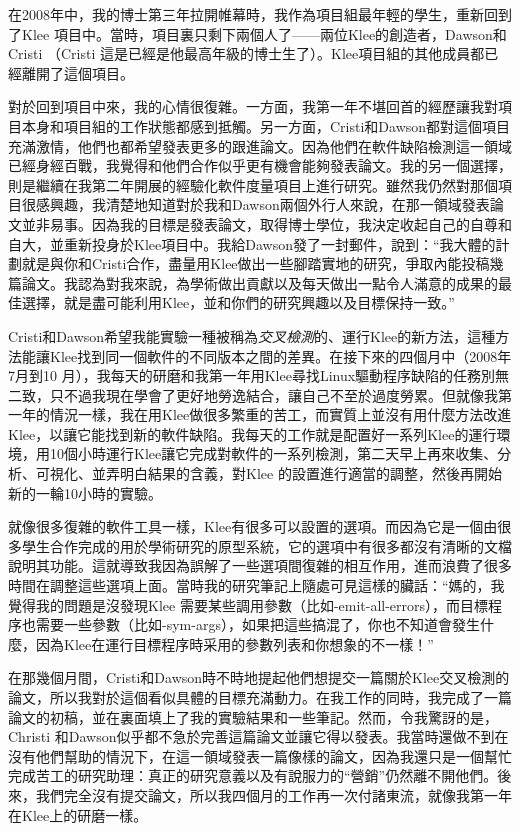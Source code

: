 \documentclass[12pt,UTF8,nofonts]{book}
\begin{document}

在2008年中，我的博士第三年拉開帷幕時，我作為項目組最年輕的學生，重新回到了Klee 項目中。當時，項目裏只剩下兩個人了——兩位Klee的創造者，Dawson和Cristi （Cristi 這是已經是他最高年級的博士生了）。Klee項目組的其他成員都已經離開了這個項目。

對於回到項目中來，我的心情很復雜。一方面，我第一年不堪回首的經歷讓我對項目本身和項目組的工作狀態都感到抵觸。另一方面，Cristi和Dawson都對這個項目充滿激情，他們也都希望發表更多的跟進論文。因為他們在軟件缺陷檢測這一領域已經身經百戰，我覺得和他們合作似乎更有機會能夠發表論文。我的另一個選擇，則是繼續在我第二年開展的經驗化軟件度量項目上進行研究。雖然我仍然對那個項目很感興趣，我清楚地知道對於我和Dawson兩個外行人來說，在那一領域發表論文並非易事。因為我的目標是發表論文，取得博士學位，我決定收起自己的自尊和自大，並重新投身於Klee項目中。我給Dawson發了一封郵件，說到：“我大體的計劃就是與你和Cristi合作，盡量用Klee做出一些腳踏實地的研究，爭取內能投稿幾篇論文。我認為對我來說，為學術做出貢獻以及每天做出一點令人滿意的成果的最佳選擇，就是盡可能利用Klee，並和你們的研究興趣以及目標保持一致。”

\breakline

Cristi和Dawson希望我能實驗一種被稱為\emph{交叉檢測}的、運行Klee的新方法，這種方法能讓Klee找到同一個軟件的不同版本之間的差異。在接下來的四個月中（2008年7月到10 月），我每天的研磨和我第一年用Klee尋找Linux驅動程序缺陷的任務別無二致，只不過我現在學會了更好地勞逸結合，讓自己不至於過度勞累。但就像我第一年的情況一樣，我在用Klee做很多繁重的苦工，而實質上並沒有用什麼方法改進Klee，以讓它能找到新的軟件缺陷。我每天的工作就是配置好一系列Klee的運行環境，用10個小時運行Klee讓它完成對軟件的一系列檢測，第二天早上再來收集、分析、可視化、並弄明白結果的含義，對Klee 的設置進行適當的調整，然後再開始新的一輪10小時的實驗。

就像很多復雜的軟件工具一樣，Klee有很多可以設置的選項。而因為它是一個由很多學生合作完成的用於學術研究的原型系統，它的選項中有很多都沒有清晰的文檔說明其功能。這就導致我因為誤解了一些選項間復雜的相互作用，進而浪費了很多時間在調整這些選項上面。當時我的研究筆記上隨處可見這樣的臟話：“媽的，我覺得我的問題是沒發現Klee 需要某些調用參數（比如-emit-all-errors），而目標程序也需要一些參數（比如-sym-args），如果把這些搞混了，你也不知道會發生什麼，因為Klee在運行目標程序時采用的參數列表和你想象的不一樣！”

在那幾個月間，Cristi和Dawson時不時地提起他們想提交一篇關於Klee交叉檢測的論文，所以我對於這個看似具體的目標充滿動力。在我工作的同時，我完成了一篇論文的初稿，並在裏面填上了我的實驗結果和一些筆記。然而，令我驚訝的是，Christi 和Dawson似乎都不急於完善這篇論文並讓它得以發表。我當時還做不到在沒有他們幫助的情況下，在這一領域發表一篇像樣的論文，因為我還只是一個幫忙完成苦工的研究助理：真正的研究意義以及有說服力的“營銷”仍然離不開他們。後來，我們完全沒有提交論文，所以我四個月的工作再一次付諸東流，就像我第一年在Klee上的研磨一樣。
\end{document}
